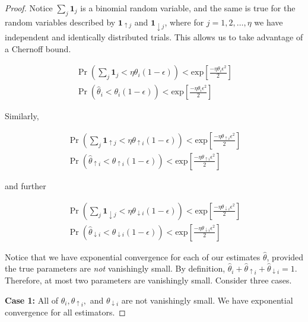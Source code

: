 \documentclass{acm_proc_article-sp}
\begin{document}
\begin{proof}

Notice $\sum_j \boldsymbol{1}_j$ is a binomial random variable, and the same is true for the random variables described by $\boldsymbol{1}_{\uparrow j}$ and $\boldsymbol{1}_{\downarrow j}$, where for $j = 1, 2, \ldots, \eta$ we have independent and identically distributed trials. This allows us to take advantage of a Chernoff bound.

\begin{align*}
\Pr \left(\sum_j \boldsymbol{1}_j < \eta \theta_i (1-\epsilon)\right) < \text{exp}\left[\frac{-\eta \theta_i  \epsilon^2}{2}\right] \\
\Pr \left (\hat{\theta}_i < \theta_i (1-\epsilon) \right) < \text{exp}\left[\frac{- \eta \theta_i \epsilon^2}{2}\right]
\end{align*}

Similarly,

\begin{align*}
\Pr \left(\sum_j \boldsymbol{1}_{\uparrow j} < \eta \theta_{\uparrow i} (1-\epsilon)\right) < \text{exp}\left[\frac{-\eta \theta_{\uparrow i}  \epsilon^2}{2}\right] \\
\Pr \left (\hat{\theta}_{\uparrow i} < \theta_{\uparrow i} (1-\epsilon) \right) < \text{exp}\left[\frac{- \eta \theta_{\uparrow i} \epsilon^2}{2}\right]
\end{align*}

and further

\begin{align*}
\Pr \left(\sum_j \boldsymbol{1}_{\downarrow j} < \eta \theta_{\downarrow i} (1-\epsilon)\right) < \text{exp}\left[\frac{-\eta \theta_{\downarrow i}  \epsilon^2}{2}\right] \\
\Pr \left (\hat{\theta}_{\downarrow i} < \theta_{\downarrow i} (1-\epsilon) \right) < \text{exp}\left[\frac{- \eta \theta_{\downarrow i} \epsilon^2}{2}\right]
\end{align*}

Notice that we have exponential convergence for each of our estimates $\hat{\theta}$, provided the true parameters are \emph{not} vanishingly small. By definition, $\hat{\theta}_i + \hat{\theta}_{\uparrow i} + \hat{\theta}_{\downarrow i} = 1$. Therefore, at most two parameters are vanishingly small. Consider three cases.

\textbf{Case 1:} All of $\theta_i, \theta_{\uparrow i},$ and $\theta_{\downarrow i}$ are not vanishingly small. We have exponential convergence for all estimators.


\end{proof}
\end{document}
